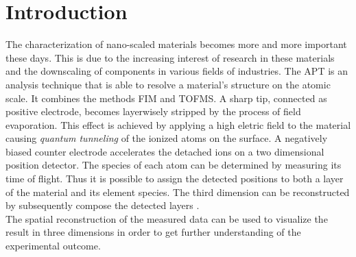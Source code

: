 \chapter{Introduction}
\label{sec:introduction}

%

The characterization of nano-scaled materials becomes more and more important these days. This is due to the increasing interest of research in these materials and the downscaling of components in various fields of industries. The \ac{APT} is an analysis technique that is able to resolve a material's structure on the atomic scale. 
It combines the methods \ac{FIM} and \ac{TOFMS}. A sharp tip, connected as positive electrode, becomes layerwisely stripped by the process of field evaporation. This effect is achieved by applying a high eletric field to the material causing \emph{quantum tunneling} of the ionized atoms on the surface. A negatively biased counter electrode accelerates the detached ions on a two dimensional position detector. The species of each atom can be determined by measuring its time of flight. Thus it is possible to assign the detected positions to both a layer of the material and its element species. The third dimension can be reconstructed by subsequently compose the detected layers \cite{Hel02}. \\

The spatial reconstruction of the measured data can be used to visualize the result in three dimensions in order to get further understanding of the experimental outcome.
